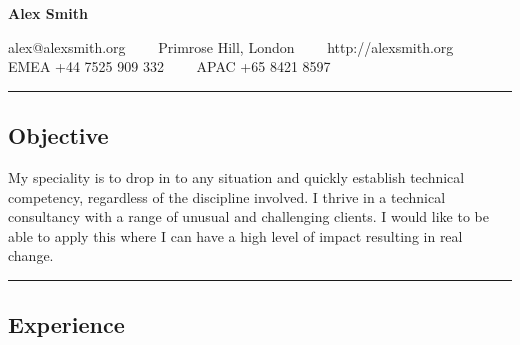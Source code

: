 \documentclass[10pt,a4paper]{article}
\begin{document}
\begin{center}
{\LARGE \textbf{Alex Smith}}


alex@alexsmith.org\ \ \textbullet
\ \ Primrose Hill, London\ \ \textbullet
\ \ http://alexsmith.org
\\
EMEA +44 7525 909 332\ \ \textbullet
\ \ APAC +65 8421 8597
\end{center}

\hrule
\vspace{-0.4em}
\subsection*{Objective}
	My speciality is to drop in to any situation and quickly establish technical competency, regardless of the discipline involved. I thrive in a technical consultancy with a range of unusual and challenging clients. I would like to be able to apply this where I can have a high level of impact resulting in real change.
	\\

\hrule
\vspace{-0.4em}
\subsection*{Experience}
\end{document}
